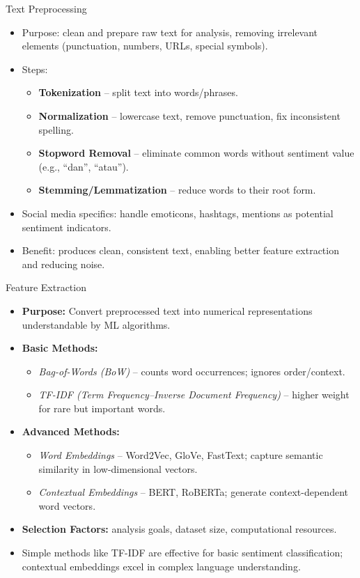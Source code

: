 \documentclass[aspectratio=169, table]{beamer}
\begin{document}
\begin{frame}{Text Preprocessing}
	\vspace{20pt}
	\begin{itemize}
		\item Purpose: clean and prepare raw text for analysis, removing irrelevant elements (punctuation, numbers, URLs, special symbols).
		\item Steps:
		\begin{itemize}
			\item \textbf{Tokenization} – split text into words/phrases.
			\item \textbf{Normalization} – lowercase text, remove punctuation, fix inconsistent spelling.
			\item \textbf{Stopword Removal} – eliminate common words without sentiment value (e.g., “dan”, “atau”).
			\item \textbf{Stemming/Lemmatization} – reduce words to their root form.
		\end{itemize}
		\item Social media specifics: handle emoticons, hashtags, mentions as potential sentiment indicators.
		\item Benefit: produces clean, consistent text, enabling better feature extraction and reducing noise.
	\end{itemize}
\end{frame}

\begin{frame}{Feature Extraction}
	\vspace{20pt}
	\begin{itemize}
		\item \textbf{Purpose:} Convert preprocessed text into numerical representations understandable by ML algorithms.
		\item \textbf{Basic Methods:}
		\begin{itemize}
			\item \textit{Bag-of-Words (BoW)} – counts word occurrences; ignores order/context.
			\item \textit{TF-IDF (Term Frequency–Inverse Document Frequency)} – higher weight for rare but important words.
		\end{itemize}
		\item \textbf{Advanced Methods:}
		\begin{itemize}
			\item \textit{Word Embeddings} – Word2Vec, GloVe, FastText; capture semantic similarity in low-dimensional vectors.
			\item \textit{Contextual Embeddings} – BERT, RoBERTa; generate context-dependent word vectors.
		\end{itemize}
		\item \textbf{Selection Factors:} analysis goals, dataset size, computational resources.
		\item Simple methods like TF-IDF are effective for basic sentiment classification; contextual embeddings excel in complex language understanding.
	\end{itemize}
\end{frame}
\end{document}

